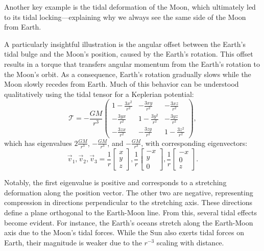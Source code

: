            Another key example is the tidal deformation of the Moon, which ultimately led to its tidal locking—explaining why we always see the same side of the Moon from Earth.

            A particularly insightful illustration is the angular offset between the Earth's tidal bulge and the Moon's position, caused by the Earth's rotation. This offset results in a torque that transfers angular momentum from the Earth's rotation to the Moon's orbit. As a consequence, Earth's rotation gradually slows while the Moon slowly recedes from Earth. Much of this behavior can be understood qualitatively using the tidal tensor for a Keplerian potential:
            \begin{equation}
                \mathcal{T}= -\frac{GM}{r^3}\left(\begin{matrix}
                    1-\frac{3x^2}{r^2} & -\frac{3xy}{r^2} & -\frac{3xz}{r^2} \\
                    -\frac{3yx}{r^2} & 1-\frac{3y^2}{r^2} & -\frac{3yz}{r^2} \\
                    -\frac{3zx}{r^2} & -\frac{3zy}{r^2} & 1-\frac{3z^2}{r^2}
                \end{matrix}\right),
            \end{equation}
            which has eigenvalues $2\frac{GM}{r^3}$, $-\frac{GM}{r^3}$, and $-\frac{GM}{r^3}$, with corresponding eigenvectors:
            \begin{equation}
                \vec{v}_1,\vec{v}_2,\vec{v}_3 = \dfrac{1}{r}\begin{bmatrix} x \\ y \\ z \end{bmatrix}, \dfrac{1}{r}\begin{bmatrix} -x \\ y \\ 0 \end{bmatrix}, \dfrac{1}{r}\begin{bmatrix} -x \\ 0 \\ z \end{bmatrix}.
            \end{equation}

            Notably, the first eigenvalue is positive and corresponds to a stretching deformation along the position vector. The other two are negative, representing compression in directions perpendicular to the stretching axis. These directions define a plane orthogonal to the Earth-Moon line. From this, several tidal effects become evident. For instance, the Earth's oceans stretch along the Earth-Moon axis due to the Moon's tidal forces. While the Sun also exerts tidal forces on Earth, their magnitude is weaker due to the $r^{-3}$ scaling with distance.

